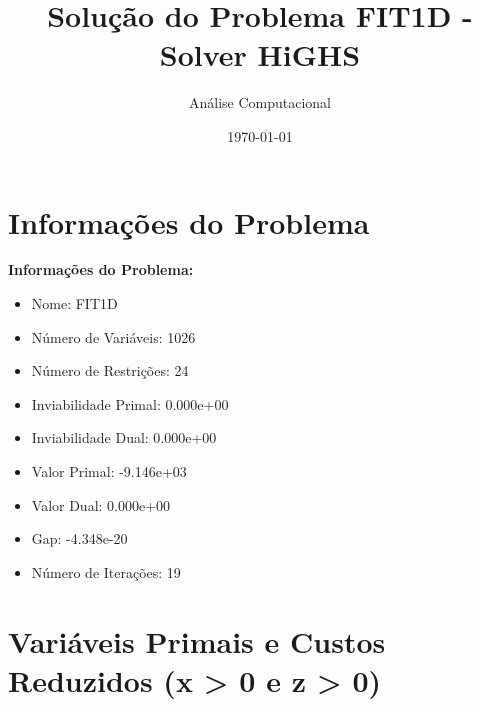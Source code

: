 \documentclass[12pt]{article}
\title{Solução do Problema FIT1D - Solver HiGHS}
\author{Análise Computacional}
\date{\today}
\begin{document}
\maketitle

\section{Informações do Problema}

\textbf{Informações do Problema:}
\begin{itemize}
\item Nome: FIT1D
\item Número de Variáveis: 1026
\item Número de Restrições: 24
\item Inviabilidade Primal: 0.000e+00
\item Inviabilidade Dual: 0.000e+00
\item Valor Primal: -9.146e+03
\item Valor Dual: 0.000e+00
\item Gap: -4.348e-20
\item Número de Iterações: 19
\end{itemize}


\section{Variáveis Primais e Custos Reduzidos (x > 0 e z > 0)}
\end{document}
